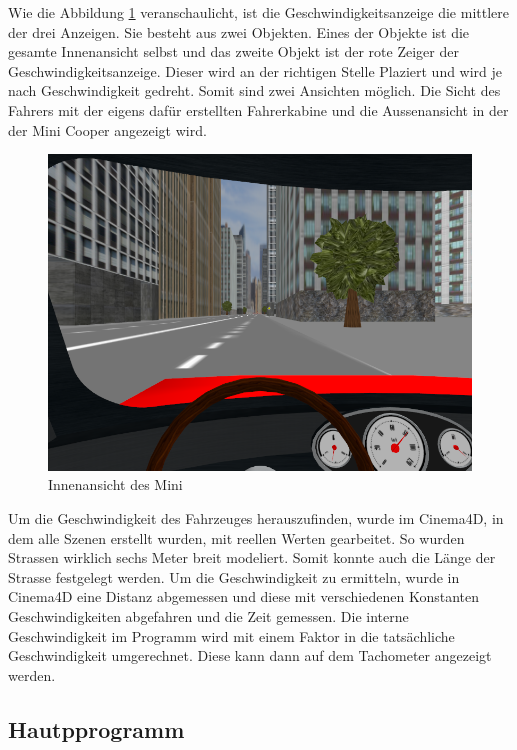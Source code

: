 \newpage
Wie die Abbildung \ref{screenshot_cockpit} veranschaulicht, ist die Geschwindigkeitsanzeige die mittlere der drei Anzeigen. Sie besteht aus zwei Objekten. Eines der Objekte ist die gesamte Innenansicht selbst und das zweite Objekt ist der rote Zeiger der Geschwindigkeitsanzeige. Dieser wird an der richtigen Stelle Plaziert und wird je nach Geschwindigkeit gedreht. Somit sind zwei Ansichten möglich. Die Sicht des Fahrers mit der eigens dafür erstellten Fahrerkabine und die Aussenansicht in der der Mini Cooper angezeigt wird.
\begin{figure}[H]
\centering 
\includegraphics[width=1\linewidth]{src/screenshot_cockpit.png}
\caption{Innenansicht des Mini} %
\label{screenshot_cockpit} %
\end{figure}
Um die Geschwindigkeit des Fahrzeuges herauszufinden, wurde im Cinema4D, in dem alle Szenen erstellt wurden, mit reellen Werten gearbeitet. So wurden Strassen wirklich sechs Meter breit modeliert. Somit konnte auch die Länge der Strasse festgelegt werden. Um die Geschwindigkeit zu ermitteln, wurde in Cinema4D eine Distanz abgemessen und diese mit verschiedenen Konstanten Geschwindigkeiten abgefahren und die Zeit gemessen. Die interne Geschwindigkeit im Programm wird mit einem Faktor in die tatsächliche Geschwindigkeit umgerechnet. Diese kann dann auf dem Tachometer angezeigt werden.\\



\newpage
\subsection{Hautpprogramm}

